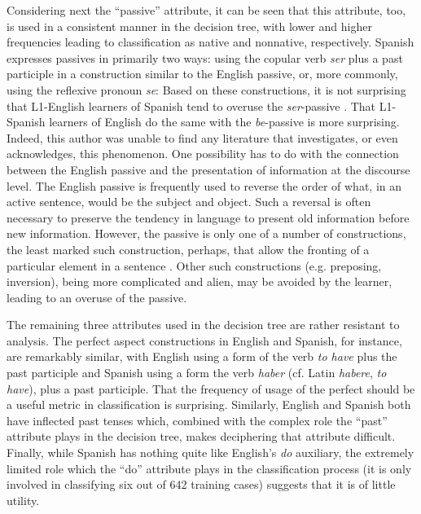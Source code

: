 \documentclass[main.tex]{subfiles}
\begin{document}
Considering next the ``passive'' attribute, it can be seen that this attribute, too, is used in a consistent manner in the decision tree, with lower and higher frequencies leading to classification as native and nonnative, respectively. Spanish expresses passives in primarily two ways: using the copular verb \textit{ser} plus a past participle in a construction similar to the English passive, or, more commonly, using the reflexive pronoun \textit{se}:
Based on these constructions, it is not surprising that L1-English learners of Spanish tend to overuse the \textit{ser}-passive \citep[p. 406]{butt}. That L1-Spanish learners of English do the same with the \textit{be}-passive is more surprising. Indeed, this author was unable to find any literature that investigates, or even acknowledges, this phenomenon. One possibility has to do with the connection between the English passive and the presentation of information at the discourse level. The English passive is frequently used to reverse the order of what, in an active sentence, would be the subject and object. Such a reversal is often necessary to preserve the tendency in language to present old information before new information. However, the passive is only one of a number of constructions, the least marked such construction, perhaps, that allow the fronting of a particular element in a sentence \citep{ward:2008}. Other such constructions (e.g. preposing, inversion), being more complicated and alien, may be avoided by the learner, leading to an overuse of the passive.

The remaining three attributes used in the decision tree are rather resistant to analysis. The perfect aspect constructions in English and Spanish, for instance, are remarkably similar, with English using a form of the verb \textit{to have} plus the past participle and Spanish using a form the verb \textit{haber} (cf. Latin \textit{habere}, \textit{to have}), plus a past participle. That the frequency of usage of the perfect should be a useful metric in classification is surprising. Similarly, English and Spanish both have inflected past tenses which, combined with the complex role the ``past'' attribute plays in the decision tree, makes deciphering that attribute difficult. Finally, while Spanish has nothing quite like English's \textit{do} auxiliary, the extremely limited role which the ``do'' attribute plays in the classification process (it is only involved in classifying six out of 642 training cases) suggests that it is of little utility.
\end{document}
